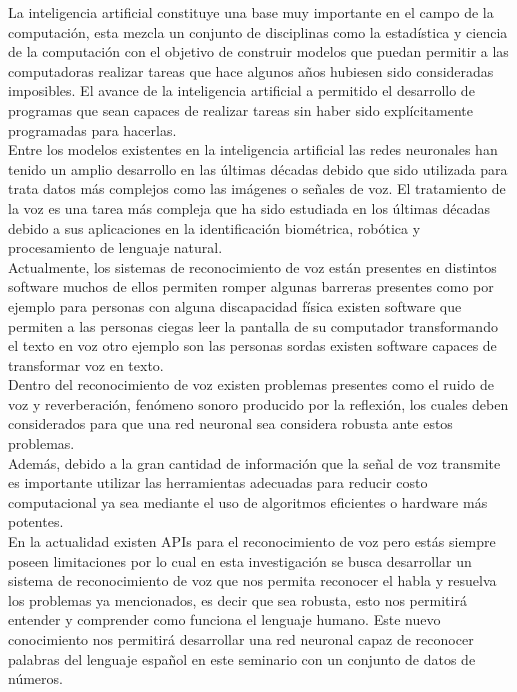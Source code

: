 La inteligencia artificial constituye una base muy importante en el campo de la computación, esta mezcla un conjunto de disciplinas como la estadística y ciencia de la computación con el objetivo de construir modelos que puedan permitir a las computadoras realizar tareas que hace algunos años hubiesen sido consideradas imposibles. El avance de la inteligencia artificial a permitido el desarrollo de programas que sean capaces de realizar tareas sin haber sido explícitamente programadas para hacerlas.\\
Entre los modelos existentes en la inteligencia artificial las redes neuronales han tenido un amplio desarrollo en las últimas décadas debido que sido utilizada para trata datos más complejos como las imágenes o señales de voz. El tratamiento de la voz es una tarea más compleja que ha sido estudiada en los últimas décadas debido a sus aplicaciones en la identificación biométrica, robótica y procesamiento de lenguaje natural.\\
Actualmente, los sistemas de reconocimiento de voz están presentes en distintos software muchos de ellos permiten romper algunas barreras presentes como por ejemplo para personas con alguna discapacidad física existen software que permiten a las personas ciegas leer la pantalla de su computador transformando el texto en voz otro ejemplo son las personas sordas existen software capaces de transformar voz en texto.\\
Dentro del reconocimiento de voz existen problemas presentes como el ruido de voz y reverberación, fenómeno sonoro producido por la reflexión,  los cuales deben considerados para que una red neuronal sea considera robusta ante estos problemas.\\ Además, debido a la gran cantidad de información que la señal de voz transmite es importante utilizar las herramientas adecuadas para reducir costo computacional ya sea mediante el uso de algoritmos eficientes o hardware más potentes.\\
En la actualidad existen APIs para el reconocimiento de voz pero estás siempre poseen limitaciones por lo cual en esta investigación se busca desarrollar un sistema de reconocimiento de voz que nos permita reconocer el habla y resuelva los problemas ya mencionados, es decir que sea robusta, esto nos permitirá entender y comprender como funciona el lenguaje humano. Este nuevo conocimiento nos permitirá desarrollar una red neuronal capaz de reconocer palabras del lenguaje español en este seminario con un conjunto de datos de números.

